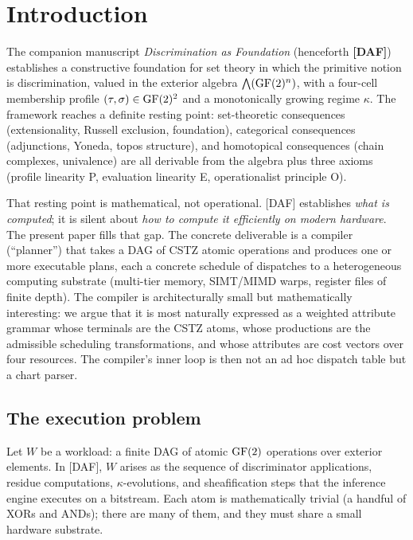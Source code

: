 \section{Introduction}\label{sec:intro}

The companion manuscript \emph{Discrimination as Foundation}
(henceforth \textbf{[DAF]}) establishes a constructive foundation
for set theory in which the primitive notion is discrimination, valued
in the exterior algebra $\bigwedge(\operatorname{GF}(2)^n)$, with a four-cell
membership profile $(\tau, \sigma) \in \operatorname{GF}(2)^2$ and a monotonically
growing regime $\kappa$. The framework reaches a definite resting
point: set-theoretic consequences (extensionality, Russell exclusion,
foundation), categorical consequences (adjunctions, Yoneda, topos
structure), and homotopical consequences (chain complexes, univalence)
are all derivable from the algebra plus three axioms (profile
linearity \textsf{P}, evaluation linearity \textsf{E}, operationalist
principle \textsf{O}).

That resting point is mathematical, not operational. [DAF]
establishes \emph{what is computed}; it is silent about
\emph{how to compute it efficiently on modern hardware}. The present
paper fills that gap. The concrete deliverable is a compiler
(``planner'') that takes a DAG of CSTZ atomic operations and
produces one or more executable plans, each a concrete schedule of
dispatches to a heterogeneous computing substrate (multi-tier memory,
SIMT/MIMD warps, register files of finite depth). The compiler is
architecturally small but mathematically interesting: we argue that
it is most naturally expressed as a weighted attribute grammar whose
terminals are the CSTZ atoms, whose productions are the admissible
scheduling transformations, and whose attributes are cost vectors
over four resources. The compiler's inner loop is then not an
ad hoc dispatch table but a chart parser.

\subsection{The execution problem}

Let $W$ be a workload: a finite DAG of atomic $\operatorname{GF}(2)$ operations
over exterior elements. In [DAF], $W$ arises as the sequence of
discriminator applications, residue computations, $\kappa$-evolutions,
and sheafification steps that the inference engine executes on a
bitstream. Each atom is mathematically trivial (a handful of XORs
and ANDs); there are many of them, and they must share a small
hardware substrate.

